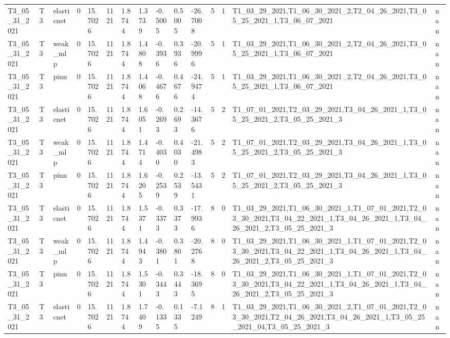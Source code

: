 \begin{table}[t]
\begin{tabular}{lllllllllllllll}
T3\_05\_31\_2021 & T3 & elasticnet & 0 & 15.7026 & 1121 & 1.8744 & 1.3739 & -0.5005 & 0.5005 & -26.7008 & 5 & 1 & T1\_03\_29\_2021,T1\_06\_30\_2021\_2,T2\_04\_26\_2021,T3\_05\_25\_2021\_1,T3\_06\_07\_2021 & nan \\
T3\_05\_31\_2021 & T3 & weak\_mlp & 0 & 15.7026 & 1121 & 1.8744 & 1.4808 & -0.3936 & 0.3936 & -20.9996 & 5 & 1 & T1\_03\_29\_2021,T1\_06\_30\_2021\_2,T2\_04\_26\_2021,T3\_05\_25\_2021\_1,T3\_06\_07\_2021 & nan \\
T3\_05\_31\_2021 & T3 & pinn & 0 & 15.7026 & 1121 & 1.8744 & 1.4068 & -0.4676 & 0.4676 & -24.9474 & 5 & 1 & T1\_03\_29\_2021,T1\_06\_30\_2021\_2,T2\_04\_26\_2021,T3\_05\_25\_2021\_1,T3\_06\_07\_2021 & nan \\
T3\_05\_31\_2021 & T3 & elasticnet & 0 & 15.7026 & 1121 & 1.8744 & 1.6051 & -0.2693 & 0.2693 & -14.3676 & 5 & 2 & T1\_07\_01\_2021,T2\_03\_29\_2021,T3\_04\_26\_2021\_1,T3\_05\_25\_2021\_2,T3\_05\_25\_2021\_3 & nan \\
T3\_05\_31\_2021 & T3 & weak\_mlp & 0 & 15.7026 & 1121 & 1.8744 & 1.4714 & -0.4030 & 0.4030 & -21.4983 & 5 & 2 & T1\_07\_01\_2021,T2\_03\_29\_2021,T3\_04\_26\_2021\_1,T3\_05\_25\_2021\_2,T3\_05\_25\_2021\_3 & nan \\
T3\_05\_31\_2021 & T3 & pinn & 0 & 15.7026 & 1121 & 1.8744 & 1.6205 & -0.2539 & 0.2539 & -13.5431 & 5 & 2 & T1\_07\_01\_2021,T2\_03\_29\_2021,T3\_04\_26\_2021\_1,T3\_05\_25\_2021\_2,T3\_05\_25\_2021\_3 & nan \\
T3\_05\_31\_2021 & T3 & elasticnet & 0 & 15.7026 & 1121 & 1.8744 & 1.5371 & -0.3373 & 0.3373 & -17.9936 & 8 & 0 & T1\_03\_29\_2021,T1\_06\_30\_2021\_1,T1\_07\_01\_2021,T2\_03\_30\_2021,T3\_04\_22\_2021\_1,T3\_04\_26\_2021\_1,T3\_04\_26\_2021\_2,T3\_05\_25\_2021\_3 & nan \\
T3\_05\_31\_2021 & T3 & weak\_mlp & 0 & 15.7026 & 1121 & 1.8744 & 1.4943 & -0.3801 & 0.3801 & -20.2768 & 8 & 0 & T1\_03\_29\_2021,T1\_06\_30\_2021\_1,T1\_07\_01\_2021,T2\_03\_30\_2021,T3\_04\_22\_2021\_1,T3\_04\_26\_2021\_1,T3\_04\_26\_2021\_2,T3\_05\_25\_2021\_3 & nan \\
T3\_05\_31\_2021 & T3 & pinn & 0 & 15.7026 & 1121 & 1.8744 & 1.5301 & -0.3443 & 0.3443 & -18.3695 & 8 & 0 & T1\_03\_29\_2021,T1\_06\_30\_2021\_1,T1\_07\_01\_2021,T2\_03\_30\_2021,T3\_04\_22\_2021\_1,T3\_04\_26\_2021\_1,T3\_04\_26\_2021\_2,T3\_05\_25\_2021\_3 & nan \\
T3\_05\_31\_2021 & T3 & elasticnet & 0 & 15.7026 & 1121 & 1.8744 & 1.7409 & -0.1335 & 0.1335 & -7.1249 & 8 & 1 & T1\_03\_29\_2021,T1\_06\_30\_2021\_2,T1\_07\_01\_2021,T2\_03\_30\_2021,T2\_04\_26\_2021,T3\_04\_26\_2021\_1,T3\_05\_25\_2021\_04,T3\_05\_25\_2021\_3 & nan \\

\end{tabular}
\end{table}
